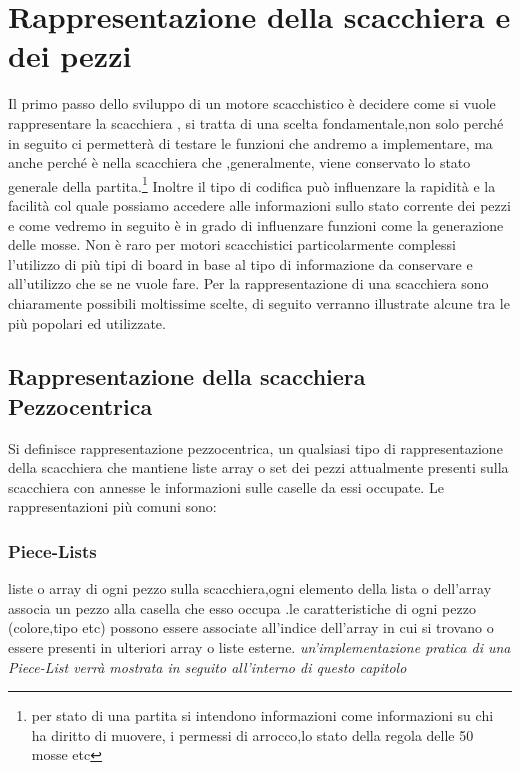 \section{Rappresentazione della scacchiera e dei pezzi} %
Il primo passo dello sviluppo di un motore scacchistico è decidere come si vuole rappresentare
la scacchiera , si tratta di una scelta fondamentale,non solo perché in seguito ci permetterà
di testare le funzioni che andremo a implementare, ma anche perché è nella scacchiera che ,generalmente,
viene conservato lo stato generale della partita.\footnote{per stato di una partita si intendono informazioni come
    informazioni su chi ha diritto di muovere, i permessi di arrocco,lo stato della regola delle 50 mosse etc}
Inoltre il tipo di codifica può influenzare la rapidità
e la facilità col quale possiamo accedere alle informazioni sullo stato corrente dei pezzi
e come vedremo in seguito è in grado di influenzare funzioni come la generazione delle mosse.
Non è raro per motori scacchistici particolarmente complessi l'utilizzo di più tipi di board in base
al tipo di informazione da conservare e all'utilizzo che se ne vuole fare.
Per la rappresentazione di una scacchiera sono chiaramente possibili moltissime scelte, di seguito
verranno illustrate alcune tra le più popolari ed utilizzate.

\subsection{Rappresentazione della scacchiera Pezzocentrica}
Si definisce rappresentazione pezzocentrica, un qualsiasi tipo di rappresentazione della scacchiera che mantiene liste
array o set dei pezzi attualmente presenti sulla scacchiera con annesse le informazioni sulle caselle da essi occupate.
Le rappresentazioni più comuni sono:
\subsubsection{Piece-Lists}
liste o array di ogni pezzo sulla scacchiera,ogni elemento della lista o dell'array associa un pezzo
alla casella che esso occupa .le caratteristiche di ogni pezzo (colore,tipo etc)
possono essere associate all'indice dell'array in cui si trovano o essere presenti in ulteriori array
o liste esterne. \emph{un'implementazione pratica di una Piece-List verrà mostrata in seguito all'interno
    di questo capitolo}


